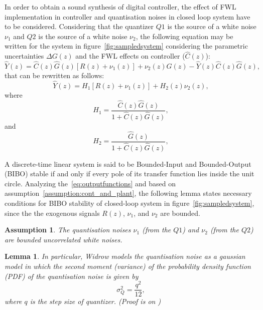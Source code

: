 \documentclass{sig-alternate-05-2015}
\newtheorem{myassumption}{Assumption}
\newtheorem{mylemma}{Lemma}
\begin{document}
In order to obtain a sound synthesis of digital controller, the effect of FWL implementation in controller and quantisation noises in closed loop system have to be considered. Considering that the quantizer $Q1$ is the source of a white noise $\nu_{1}$ and $Q2$ is the source of a white noise $\nu_{2}$, the following equation may be written for the system in figure~\ref{fig:sampledsystem} considering the parametric uncertainties $\Delta G(z)$ and the FWL effects on controller  ($\hat{C}(z)$):
\begin{equation}
\hat{Y}(z)=\hat{C}(z)\hat{G}(z)[R(z)+\nu_{1}(z)]+\nu_{2}(z)\hat{G}(z)-\hat{Y}(z)\hat{C}(z)\hat{G}(z),
\end{equation}
that can be rewritten as follows:
\begin{equation}
\label{eq:outputfunctions}
\hat{Y}(z)=H_{1}[R(z)+\nu_{1}(z)]+H_{2}(z)\nu_{2}(z),
\end{equation}
where
\begin{equation}
H_{1}=\frac{\hat{C}(z)\hat{G}(z)}{1+\hat{C}(z)\hat{G}(z)},
\end{equation}
and
\begin{equation}
H_{2}=\frac{\hat{G}(z)}{1+\hat{C}(z)\hat{G}(z)},
\end{equation}



A discrete-time linear system is said to be Bounded-Input and Bounded-Output (BIBO) stable if and only if every pole of its transfer function lies inside the unit circle. Analyzing the~\eqref{eq:outputfunctions} and based on assumption~\ref{assumption:cont_and_plant}, the following lemma states necessary conditions for BIBO stability of closed-loop system in figure~\ref{fig:sampledsystem}, since the the exogenous signals $R(z)$, $\nu_{1}$, and $\nu_{2}$ are bounded.

\begin{myassumption}
\label{whitenoise}
%
The quantisation noises $\nu_{1}$ (from the $Q1$) and $\nu_{2}$ (from the
$Q2$) are bounded uncorrelated white noises.
% 
\end{myassumption}

\begin{mylemma}
\label{lemma:variance}
In particular, Widrow \cite{widrow1956} models the quantisation noise as a gaussian
model in which the second moment (variance) of the probability density
function (PDF) of the quantisation noise is given by
%
\begin{equation}
\label{eq:variancelemma}
\sigma_{Q}^{2}=\frac{q^{2}}{12},
\end{equation}
where $q$ is the step size of quantizer. (Proof is on \cite{widrow1956})
\end{mylemma}
\end{document}
